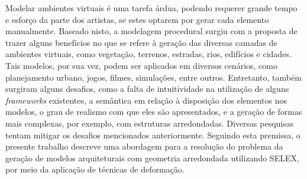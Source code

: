 Modelar ambientes virtuais é uma tarefa árdua, podendo requerer grande tempo e esforço da parte dos artistas, se estes optarem por gerar cada elemento manualmente. Baseado nisto, a modelagem procedural surgiu com a proposta de trazer alguns benefícios no que se refere à geração das diversas camadas de ambientes virtuais, como vegetação, terrenos, estradas, rios, edifícios e cidades. Tais modelos, por sua vez, podem ser aplicados em diversos cenários, como planejamento urbano, jogos, filmes, simulações, entre outros. Entretanto, também surgiram alguns desafios, como a falta de intuitividade na utilização de alguns \textit{frameworks} existentes, a semântica em relação à disposição dos elementos nos modelos, o grau de realismo com que eles são apresentados, e a geração de formas mais complexas, por exemplo, com estruturas arredondadas. Diversas pesquisas tentam mitigar os desafios mencionados anteriormente. Seguindo esta premissa, o presente trabalho descreve uma abordagem para a resolução do problema da geração de modelos arquiteturais com geometria arredondada utilizando \gls{SELEX}, por meio da aplicação de técnicas de deformação.

